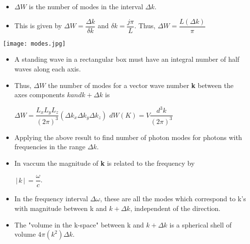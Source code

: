 \documentclass[aspectratio=169]{beamer}
\newcommand{\highlight}[1]{\fcolorbox{yellow}{yellow}{#1}}
\begin{document}
\begin{frame}
	\begin{itemize}
		\item $\Delta W$ is the number of modes in the interval $\Delta k$.\newline
		\item This is given by $\Delta W = \dfrac{\Delta k}{\delta k}$ \newline
		    and $\delta k = \dfrac{j\pi}{L}$.\newline
		    Thus, $ \Delta W = \dfrac{L (\Delta k)}{\pi}$ \newline\newline 
		   \highlight {$ \Delta W = \dfrac{L (\Delta k)}{2\pi}$}
		 
	\end{itemize}
\end{frame}

\begin{frame}
 \center \texttt{[image: modes.jpg]}
\end{frame}

\begin{frame}
	\begin{itemize}
		\item A standing wave in a rectangular box must have an integral number of half waves along each axis.
		\item Thus, $\Delta W$ the number of modes for a vector wave number \textbf{k} between the axes components $k and k+\Delta k$ is \newline
		
		\center $\Delta W = \dfrac{L_{x}L_{y}L_{z}}{(2\pi)^3}(\Delta k_{x}\Delta k_{y} \Delta k_{z})$ \newline
		$dW(K) = V\dfrac{d^3k}{(2\pi)^3}$
		
	\end{itemize}
\end{frame}

\begin{frame}
	\begin{itemize}
		\item Applying the above result to find number of photon modes for photons with frequencies in the range $\Delta k$.
		\item In vaccum the magnitude of \textbf{k} is related to the frequency by \newline
		
		$ \,\Bigr\rvert\,k\,\Bigr\rvert\, = \dfrac{\omega}{c}$.\newline
		\item In the frequency interval $\Delta \omega$, these are all the modes which correspond to k's with magnitude between k and $k + \Delta k$, independent of the direction.
		\item The "volume in the k-space" between k and $k + \Delta k $ is a spherical shell of volume \newline
		$ 4\pi(k^2)\Delta k$.
	\end{itemize}
\end{frame}
\end{document}
